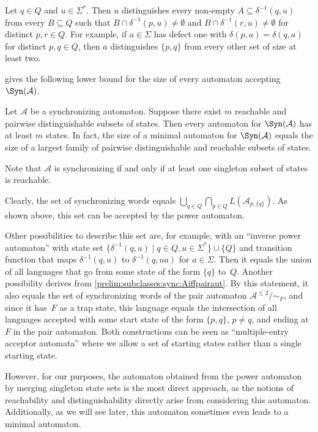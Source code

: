 \begin{remark}
	Let $q \in Q$ and $u \in \Sigma^*$.
	Then $u$ distinguishes every non-empty $A \subseteq \delta^{-1}(q, u)$
	from every $B \subseteq Q$
	such that $B \cap \delta^{-1}(p, u) \ne \emptyset$ 
	and $B \cap \delta^{-1}(r, u) \ne \emptyset$
	for distinct $p, r \in Q$.
	For example, if $a \in \Sigma$ has defect one
	with $\delta(p, a) = \delta(q, a)$ for distinct $p,q \in Q$,
	then $a$ distinguishes $\{p,q\}$ from every other set of size at least two.	
\end{remark}

gives the following lower bound for the size of every automaton accepting $\Syn(\mathcal A)$.

\begin{theorem}
	\label{sync_max:thm:lower_bound_SynA}
	Let $\mathcal A$ be a synchronizing automaton. Suppose there exist
	$m$ reachable and pairwise distinguishable subsets of states.
	Then every automaton for $\Syn(\mathcal A)$ has at least $m$
	states.	
	In fact, the size of a minimal automaton
	for $\Syn(\mathcal A)$ equals
	the size of a largest family of pairwise distinguishable and reachable subsets of states.
\end{theorem}

Note that $\mathcal A$ is synchronizing if and only if at least one singleton subset of states is reachable.

\begin{remark}
	Clearly, the set
	of synchronizing words equals 
	$\bigcup_{q \in Q} \bigcap_{p \in Q} L(\mathcal A_{p, \{q\}})$.
	As shown above, this set can be accepted
	by the power automaton.
	
	Other possibilities to describe 
	this set are, for example, with
	an ``inverse power automaton''
	with state set
    $\{ \delta^{-1}(q, u) \mid q \in Q, u \in \Sigma^* \} \cup \{ Q \}$
	and transition function that maps $\delta^{-1}(q, u)$
	to $\delta^{-1}(q, ua)$ for $a \in \Sigma$.
	Then it equals the union of all languages
	that go from some state of the form $\{q\}$
	to~$Q$. Another possibility
	derives from \cref{prelim:subclasses:sync:Aiffpairaut}.
	By this statement, it also equals the set of synchronizing
	words of the pair automaton $\mathcal A^{\le 2} / {\sim_F}$,
	and since it has~$F$ as a trap state,
	this language equals the intersection of all languages accepted
	with some start state of the form $\{p,q\}$, $p \ne q$,
    and ending at~$F$ in the pair automaton.
    Both constructions can be seen as ``multiple-entry acceptor automata'' where we allow a set of starting states rather than a single starting state.

	However, for our purposes, the automaton obtained from the power automaton by merging singleton state sets is the most direct approach, as the notions of reachability and distinguishability directly arise from considering this automaton. Additionally, as we will see later, this automaton sometimes even leads to a minimal automaton.	
\end{remark}